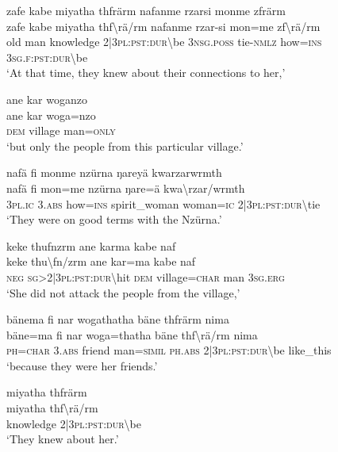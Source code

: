 \ea\label{ex:7:a4703}
zafe kabe miyatha thfrärm nafanme rzarsi monme zfrärm\\
\gll zafe	kabe	miyatha	thf{\textbackslash}rä/rm	nafanme	rzar-si	mon=me	zf{\textbackslash}rä/rm\\
     old	man	knowledge	2|3\textsc{pl}:\textsc{pst}:\textsc{dur}{\textbackslash}be	3\textsc{nsg}.\textsc{poss}	tie-\textsc{nmlz}	how=\textsc{ins}	3\textsc{sg}.\textsc{f}:\textsc{pst}:\textsc{dur}{\textbackslash}be\\
\glt `At that time, they knew about their connections to her,'
\z

\ea\label{ex:7:a4704}
ane kar woganzo\\
\gll ane	kar	woga=nzo\\
     \textsc{dem}	village	man=\textsc{only}\\
\glt `but only the people from this particular village.'
\z

\ea\label{ex:7:a4705}
nafä fi monme nzürna ŋareyä kwarzarwrmth\\
\gll nafä	fi	mon=me	nzürna	ŋare=ä	kwa{\textbackslash}rzar/wrmth\\
     3\textsc{pl}.\textsc{ic}	3.\textsc{abs}	how=\textsc{ins}	spirit\_woman	woman=\textsc{ic}	2|3\textsc{pl}:\textsc{pst}:\textsc{dur}{\textbackslash}tie\\
\glt `They were on good terms with the Nzürna.'
\z

\ea\label{ex:7:a4706}
keke thufnzrm ane karma kabe naf\\
\gll keke	thu{\textbackslash}fn/zrm	ane	kar=ma	kabe	naf\\
     \textsc{neg}	\textsc{sg}>2|3\textsc{pl}:\textsc{pst}:\textsc{dur}{\textbackslash}hit	\textsc{dem}	village=\textsc{char}	man	3\textsc{sg}.\textsc{erg}\\
\glt `She did not attack the people from the village,'
\z

\ea\label{ex:7:a4707}
bänema fi nar wogathatha bäne thfrärm nima\\
\gll bäne=ma	fi	nar	woga=thatha	bäne	thf{\textbackslash}rä/rm	nima\\
     \textsc{ph}=\textsc{char}	3.\textsc{abs}	friend	man=\textsc{simil}	\textsc{ph}.\textsc{abs}	2|3\textsc{pl}:\textsc{pst}:\textsc{dur}{\textbackslash}be	like\_this\\
\glt `because they were her friends.'
\z

\ea\label{ex:7:a4708}
miyatha thfrärm\\
\gll miyatha	thf{\textbackslash}rä/rm\\
     knowledge	2|3\textsc{pl}:\textsc{pst}:\textsc{dur}{\textbackslash}be\\
\glt `They knew about her.'
\z

